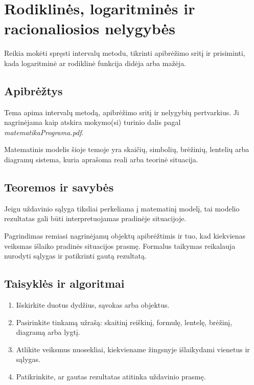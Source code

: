 \section{Rodiklinės, logaritminės ir racionaliosios nelygybės}\label{sec:rodiklines-logaritmines-ir-racionaliosios-nelygybes}

\begin{tcolorbox}[title=Prieš pradedant, colback=green!5]
Reikia mokėti spręsti intervalų metodu, tikrinti apibrėžimo sritį ir prisiminti, kada logaritminė ar rodiklinė funkcija didėja arba mažėja.
\end{tcolorbox}
\subsection{Apibrėžtys}
\begin{apibreztis}
Tema apima intervalų metodą, apibrėžimo sritį ir nelygybių pertvarkius. Ji nagrinėjama kaip atskira mokymo(si) turinio dalis pagal \emph{matematikaPrograma.pdf}.
\end{apibreztis}
\begin{apibreztis}
Matematinis modelis šioje temoje yra skaičių, simbolių, brėžinių, lentelių arba diagramų sistema, kuria aprašoma reali arba teorinė situacija.
\end{apibreztis}

\subsection{Teoremos ir savybės}
\begin{savybe}
Jeigu uždavinio sąlyga tiksliai perkeliama į matematinį modelį, tai modelio rezultatas gali būti interpretuojamas pradinėje situacijoje.
\end{savybe}
\begin{pastaba}
Pagrindimas remiasi nagrinėjamų objektų apibrėžtimis ir tuo, kad kiekvienas veiksmas išlaiko pradinės situacijos prasmę. Formalus taikymas reikalauja nurodyti sąlygas ir patikrinti gautą rezultatą.
\end{pastaba}

\subsection{Taisyklės ir algoritmai}
\begin{enumerate}[label=\arabic*.]
\item Išskirkite duotus dydžius, sąvokas arba objektus.
\item Pasirinkite tinkamą užrašą: skaitinį reiškinį, formulę, lentelę, brėžinį, diagramą arba lygtį.
\item Atlikite veiksmus nuosekliai, kiekviename žingsnyje išlaikydami vienetus ir sąlygas.
\item Patikrinkite, ar gautas rezultatas atitinka uždavinio prasmę.
\end{enumerate}

